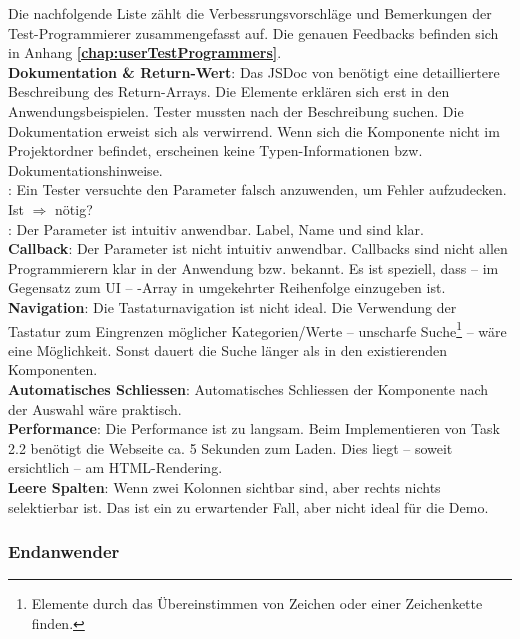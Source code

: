 Die nachfolgende Liste zählt die Verbessrungsvorschläge und Bemerkungen der Test-Programmierer zusammengefasst auf. 
Die genauen Feedbacks befinden sich in Anhang \textbf{\ref{chap:userTestProgrammers}}. 
 \\
\textbf{Dokumentation \& Return-Wert}: 
Das JSDoc von  benötigt eine detailliertere Beschreibung des Return-Arrays. 
Die Elemente erklären sich erst in den Anwendungsbeispielen. 
Tester mussten nach der Beschreibung suchen. 
Die Dokumentation erweist sich als verwirrend. 
Wenn sich die Komponente nicht im Projektordner befindet, erscheinen keine Typen-Informationen bzw. Dokumentationshinweise. 
\\
: 
Ein Tester versuchte den Parameter falsch anzuwenden, um Fehler aufzudecken. 
Ist  $\Rightarrow$  nötig? 
\\
: 
Der Parameter ist intuitiv anwendbar. 
Label, Name und  sind klar. 
\\
\textbf{Callback}: 
Der Parameter ist nicht intuitiv anwendbar. 
Callbacks sind nicht allen Programmierern klar in der Anwendung bzw. bekannt. 
Es ist speziell, dass – im Gegensatz zum UI – -Array in umgekehrter Reihenfolge einzugeben ist. 
\\
\textbf{Navigation}: 
Die Tastaturnavigation ist nicht ideal. 
Die Verwendung der Tastatur zum Eingrenzen möglicher Kategorien/Werte – unscharfe Suche\footnote{
    Elemente durch das Übereinstimmen von Zeichen oder einer Zeichenkette finden.
} – wäre eine Möglichkeit. 
Sonst dauert die Suche länger als in den existierenden Komponenten. 
\\
\textbf{Automatisches Schliessen}: 
Automatisches Schliessen der Komponente nach der Auswahl wäre praktisch. 
\\
\textbf{Performance}: 
Die Performance ist zu langsam. 
Beim Implementieren von Task 2.2 benötigt die Webseite ca. 5 Sekunden zum Laden. 
Dies liegt – soweit ersichtlich – am HTML-Rendering. 
\\
\textbf{Leere Spalten}: 
Wenn zwei Kolonnen sichtbar sind, aber rechts nichts selektierbar ist. 
Das ist ein zu erwartender Fall, aber nicht ideal für die Demo. 


\subsubsection{Endanwender} %
\label{sec:userTestsEnduser}

